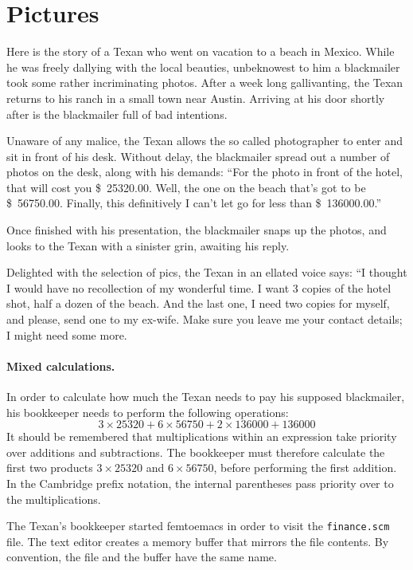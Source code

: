 \documentclass[a4paper,12pt]{book}
\begin{document}
\section{Pictures}
Here is the story of a Texan who went on
vacation to a beach in Mexico. While he was
freely dallying with the local beauties,
unbeknowest to him a blackmailer took some
rather incriminating photos.
After a week long gallivanting, the Texan
returns to his ranch in a small town near Austin.
Arriving at his door shortly after is the blackmailer
full of bad intentions.

Unaware of any malice, the Texan allows the so
called photographer to enter and sit in front
of his desk. Without delay, the blackmailer spread
out a number of photos on the desk, along with his
demands: “For the photo in front of the hotel,
that will cost you \$~25320.00. Well, the one
on the beach that's got to be \$~56750.00.
Finally, this definitively I can't let
go for less than \$~136000.00.”

Once finished with his presentation,
the blackmailer snaps up the photos,
and looks to the Texan with a sinister
grin, awaiting his reply.

Delighted with the selection of pics,
the Texan in an ellated voice says:
“I thought I would have no recollection
of my wonderful time. I want 3 copies
of the hotel shot, half a dozen of the beach.
And the last one, I need two copies for myself,
and please, send one to my ex-wife.
Make sure you leave me your contact
details; I might need some more.

\paragraph{Mixed calculations.}
In order to calculate how much the
Texan needs to pay his supposed blackmailer,
his bookkeeper needs to perform the
following operations:
$$3\times 25320+6\times 56750 + 2\times 136000+136000$$
It should be remembered that multiplications
within an expression take priority over additions
and subtractions. The bookkeeper must therefore
calculate the first two products $3\times 25320$
and $6\times 56750$, before performing the first
addition. In the Cambridge prefix notation,
the internal parentheses pass priority over
to the multiplications.

The Texan's bookkeeper started femtoemacs
in order to visit the \verb|finance.scm|
file. The text editor creates a memory
buffer that mirrors the file contents.
By convention, the file and the buffer
have the same name.
\end{document}
